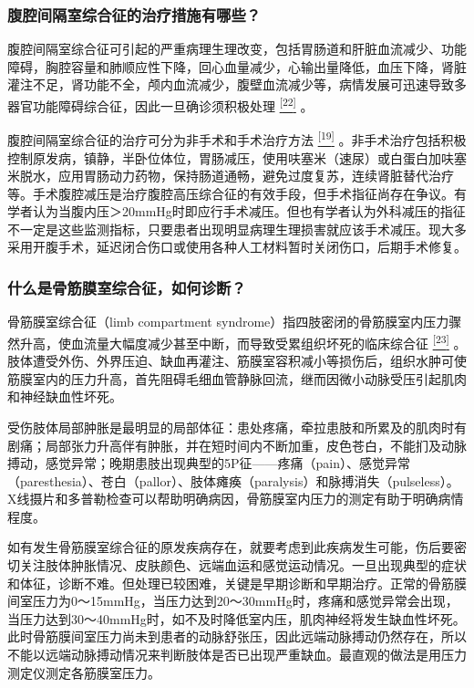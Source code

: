\subsubsection{腹腔间隔室综合征的治疗措施有哪些？}

腹腔间隔室综合征可引起的严重病理生理改变，包括胃肠道和肝脏血流减少、功能障碍，胸腔容量和肺顺应性下降，回心血量减少，心输出量降低，血压下降，肾脏灌注不足，肾功能不全，颅内血流减少，腹壁血流减少等，病情发展可迅速导致多器官功能障碍综合征，因此一旦确诊须积极处理
\protect\hyperlink{text00024.htmlux5cux23ch22-23}{\textsuperscript{{[}22{]}}}
。

腹腔间隔室综合征的治疗可分为非手术和手术治疗方法
\protect\hyperlink{text00024.htmlux5cux23ch19-23}{\textsuperscript{{[}19{]}}}
。非手术治疗包括积极控制原发病，镇静，半卧位体位，胃肠减压，使用呋塞米（速尿）或白蛋白加呋塞米脱水，应用胃肠动力药物，保持肠道通畅，避免过度复苏，连续肾脏替代治疗等。手术腹腔减压是治疗腹腔高压综合征的有效手段，但手术指征尚存在争议。有学者认为当腹内压＞20mmHg时即应行手术减压。但也有学者认为外科减压的指征不一定是这些监测指标，只要患者出现明显病理生理损害就应该手术减压。现大多采用开腹手术，延迟闭合伤口或使用各种人工材料暂时关闭伤口，后期手术修复。

\subsubsection{什么是骨筋膜室综合征，如何诊断？}

骨筋膜室综合征（limb compartment
syndrome）指四肢密闭的骨筋膜室内压力骤然升高，使血流量大幅度减少甚至中断，而导致受累组织坏死的临床综合征
\protect\hyperlink{text00024.htmlux5cux23ch23-23}{\textsuperscript{{[}23{]}}}
。肢体遭受外伤、外界压迫、缺血再灌注、筋膜室容积减小等损伤后，组织水肿可使筋膜室内的压力升高，首先阻碍毛细血管静脉回流，继而因微小动脉受压引起肌肉和神经缺血性坏死。

受伤肢体局部肿胀是最明显的局部体征：患处疼痛，牵拉患肢和所累及的肌肉时有剧痛；局部张力升高伴有肿胀，并在短时间内不断加重，皮色苍白，不能扪及动脉搏动，感觉异常；晚期患肢出现典型的5P征------疼痛（pain）、感觉异常（paresthesia）、苍白（pallor）、肢体瘫痪（paralysis）和脉搏消失（pulseless）。X线摄片和多普勒检查可以帮助明确病因，骨筋膜室内压力的测定有助于明确病情程度。

如有发生骨筋膜室综合征的原发疾病存在，就要考虑到此疾病发生可能，伤后要密切关注肢体肿胀情况、皮肤颜色、远端血运和感觉运动情况。一旦出现典型的症状和体征，诊断不难。但处理已较困难，关键是早期诊断和早期治疗。正常的骨筋膜间室压力为0～15mmHg，当压力达到20～30mmHg时，疼痛和感觉异常会出现，当压力达到30～40mmHg时，如不及时降低室内压，肌肉神经将发生缺血性坏死。此时骨筋膜间室压力尚未到患者的动脉舒张压，因此远端动脉搏动仍然存在，所以不能以远端动脉搏动情况来判断肢体是否已出现严重缺血。最直观的做法是用压力测定仪测定各筋膜室压力。

